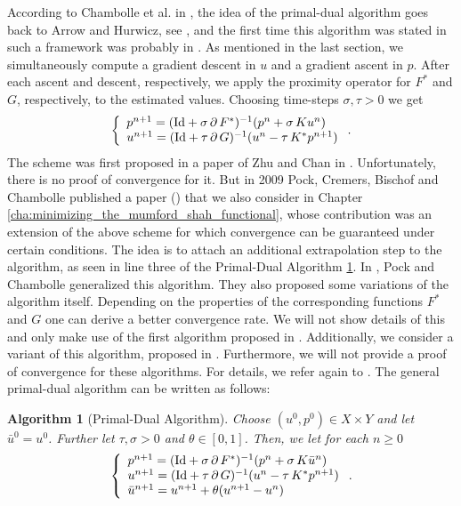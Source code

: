\documentclass[abstracton]{scrreprt}
\newtheorem{algorithm}[theorem]{Algorithm}
\begin{document}
        According to Chambolle et al. in \cite{Chambolle-et-al-10}, the idea of the primal-dual algorithm goes back to Arrow and Hurwicz, see \cite{Arrow-Hurwicz}, and the first time this algorithm was stated in such a framework was probably in \cite{Appleton-Talbot}. As mentioned in the last section, we simultaneously compute a gradient descent in $u$ and a gradient ascent in $p$. After each ascent and descent, respectively, we apply the proximity operator for $F^{\ast}$ and $G$, respectively, to the estimated values. Choosing time-steps $\sigma, \tau > 0$ we get
            $$
                \left\{ 
                    \begin{array}{l l}
                        p^{n+1} = (\textnormal{Id} + \sigma\,\partial\,F^{\ast})^{-1}(p^{n} + \sigma\,Ku^{n})\\
                        u^{n+1} = (\textnormal{Id} + \tau\,\partial\,G)^{-1}(u^{n} - \tau\,K^{\ast}p^{n+1})
                  \end{array}
                \right. .
            $$
        The scheme was first proposed in a paper of Zhu and Chan in \cite{Zhu-Chan}. Unfortunately, there is no proof of convergence for it. But in 2009 Pock, Cremers, Bischof and Chambolle published a paper (\cite{Pock-et-al-iccv09}) that we also consider in Chapter \ref{cha:minimizing_the_mumford_shah_functional}, whose contribution was an extension of the above scheme for which convergence can be guaranteed under certain conditions. The idea is to attach an additional extrapolation step to the algorithm, as seen in line three of the Primal-Dual Algorithm \ref{alg:primal_dual_algorithm}. In \cite{Chambolle10afirst-order}, Pock and Chambolle generalized this algorithm. They also proposed some variations of the algorithm itself. Depending on the properties of the corresponding functions $F^{\ast}$ and $G$ one can derive a better convergence rate. We will not show details of this and only make use of the first algorithm proposed in \cite{Chambolle10afirst-order}. Additionally, we consider a variant of this algorithm, proposed in \cite{Strekalovskiy-Cremers-eccv14}. Furthermore, we will not provide a proof of convergence for these algorithms. For details, we refer again to \cite{Chambolle10afirst-order}. The general primal-dual algorithm can be written as follows:
        \begin{algorithm}[Primal-Dual Algorithm]
        \label{alg:primal_dual_algorithm}
            Choose $(u^{0}, p^{0}) \in X \times Y$ and let $\bar{u}^{0} = u^{0}$. Further let $\tau, \sigma > 0$ and $\theta \in [0, 1]$. Then, we let for each $n \ge 0$
                $$
                    \left\{ 
                        \begin{array}{l l}
                            p^{n+1} = (\textnormal{Id} + \sigma\,\partial\,F^{\ast})^{-1}(p^{n} + \sigma\,K\bar{u}^{n}) \\
                            u^{n+1} = (\textnormal{Id} + \tau\,\partial\,G)^{-1}(u^{n} - \tau\,K^{\ast}p^{n+1}) \\
                            \bar{u}^{n+1} = u^{n+1} + \theta (u^{n+1} - u^{n})
                        \end{array}
                    \right. .
                $$
        \end{algorithm}
\end{document}
